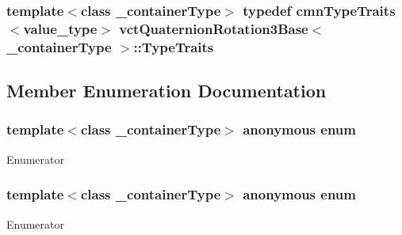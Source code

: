\subsubsection[{Type\+Traits}]{\setlength{\rightskip}{0pt plus 5cm}template$<$class \+\_\+container\+Type$>$ typedef {\bf cmn\+Type\+Traits}$<$value\+\_\+type$>$ {\bf vct\+Quaternion\+Rotation3\+Base}$<$ \+\_\+container\+Type $>$\+::{\bf Type\+Traits}}\label{classvct_quaternion_rotation3_base_a78f36636344dd97b9837f9b15aedd1f7}


\subsection{Member Enumeration Documentation}
\hypertarget{classvct_quaternion_rotation3_base_a6baf2fda4760908cbc94c53f79838804}{}\subsubsection[{anonymous enum}]{\setlength{\rightskip}{0pt plus 5cm}template$<$class \+\_\+container\+Type$>$ anonymous enum}\label{classvct_quaternion_rotation3_base_a6baf2fda4760908cbc94c53f79838804}
\begin{Desc}
\item[Enumerator]\par
\begin{description}
\item[{\em 
\hypertarget{classvct_quaternion_rotation3_base_a6baf2fda4760908cbc94c53f79838804a42527344f7f8ba3f199c418756497bc1}{}S\+I\+Z\+E\label{classvct_quaternion_rotation3_base_a6baf2fda4760908cbc94c53f79838804a42527344f7f8ba3f199c418756497bc1}
}]\end{description}
\end{Desc}
\hypertarget{classvct_quaternion_rotation3_base_a729ac03acdd5949ecf382629e563d2a0}{}\subsubsection[{anonymous enum}]{\setlength{\rightskip}{0pt plus 5cm}template$<$class \+\_\+container\+Type$>$ anonymous enum}\label{classvct_quaternion_rotation3_base_a729ac03acdd5949ecf382629e563d2a0}
\begin{Desc}
\item[Enumerator]\par
\begin{description}
\item[{\em 
\hypertarget{classvct_quaternion_rotation3_base_a729ac03acdd5949ecf382629e563d2a0a9417132a8a6849e18439d903ae6a1f18}{}D\+I\+M\+E\+N\+S\+I\+O\+N\label{classvct_quaternion_rotation3_base_a729ac03acdd5949ecf382629e563d2a0a9417132a8a6849e18439d903ae6a1f18}
}]\end{description}
\end{Desc}


